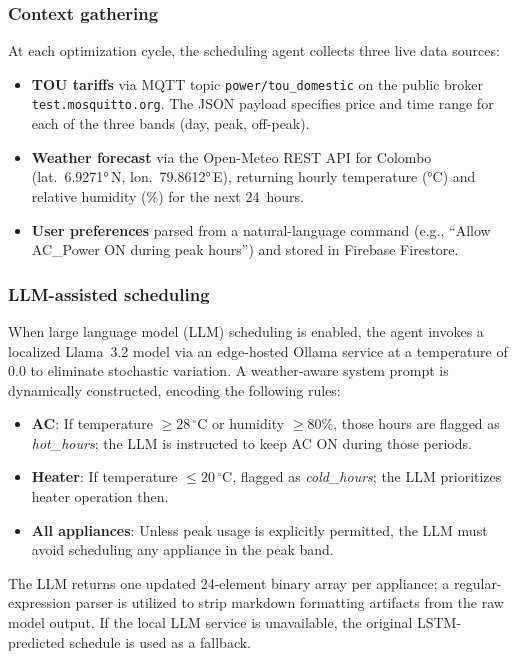 \documentclass[conference]{IEEEtran}
\begin{document}
\subsubsection{Context gathering}
At each optimization cycle, the scheduling agent collects three
live data sources:
\begin{itemize}
  \item \textbf{TOU tariffs} via MQTT topic
        \texttt{power/tou\_domestic} on the public broker
        \texttt{test.mosquitto.org}.
        The JSON payload specifies price and time range for each
        of the three bands (day, peak, off-peak).
  \item \textbf{Weather forecast} via the Open-Meteo REST API
        for Colombo (lat.~6.9271°\,N, lon.~79.8612°\,E),
        returning hourly temperature (°C) and relative humidity
        (\%) for the next 24~hours.
  \item \textbf{User preferences} parsed from a natural-language
        command (e.g., ``Allow AC\_Power ON during peak hours'')
        and stored in Firebase Firestore.
\end{itemize}

\subsubsection{LLM-assisted scheduling}
When large language model (LLM) scheduling is enabled,
the agent invokes a localized Llama~3.2 model
via an edge-hosted Ollama service at a temperature of $0.0$ to
eliminate stochastic variation.
A weather-aware system prompt is dynamically constructed,
encoding the following rules:
\begin{itemize}
  \item \textbf{AC}: If temperature $\geq 28\,^\circ\text{C}$
        or humidity $\geq 80\%$, those hours are flagged as
        \emph{hot\_hours}; the LLM is instructed to keep
        AC ON during those periods.
  \item \textbf{Heater}: If temperature $\leq 20\,^\circ\text{C}$,
        flagged as \emph{cold\_hours}; the LLM prioritizes
        heater operation then.
  \item \textbf{All appliances}: Unless peak usage is explicitly
        permitted, the LLM must avoid scheduling any appliance
        in the peak band.
\end{itemize}
The LLM returns one updated 24-element binary array per appliance;
a regular-expression parser is utilized
to strip markdown formatting artifacts from the raw model output.
If the local LLM service is unavailable, the original LSTM-predicted schedule
is used as a fallback.
\end{document}
